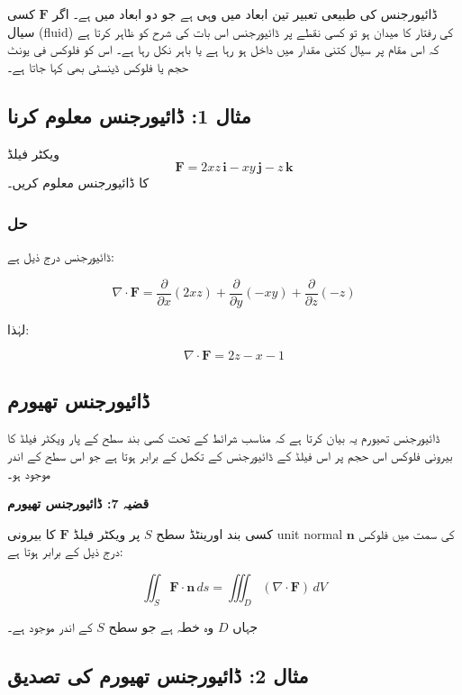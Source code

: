 \begin{enumerate}
ڈائیورجنس کی طبیعی تعبیر تین ابعاد میں وہی ہے جو دو ابعاد میں ہے۔ اگر \( \mathbf{F} \) کسی سیال (fluid) کی رفتار کا میدان ہو تو کسی نقطے پر ڈائیورجنس اس بات کی شرح کو ظاہر کرتا ہے کہ اس مقام پر سیال کتنی مقدار میں داخل ہو رہا ہے یا باہر نکل رہا ہے۔ اس کو فلوکس فی یونٹ حجم یا فلوکس ڈینسٹی بھی کہا جاتا ہے۔

\bigskip

\subsection*{مثال 1: ڈائیورجنس معلوم کرنا}

ویکٹر فیلڈ
\[
\mathbf{F} = 2xz\,\mathbf{i} - xy\,\mathbf{j} - z\,\mathbf{k}
\]
کا ڈائیورجنس معلوم کریں۔

\subsubsection*{حل}

ڈائیورجنس درج ذیل ہے:

\[
\nabla \cdot \mathbf{F}
=
\frac{\partial}{\partial x}(2xz)
+
\frac{\partial}{\partial y}(-xy)
+
\frac{\partial}{\partial z}(-z)
\]

لہٰذا:

\[
\nabla \cdot \mathbf{F}
=
2z - x - 1
\]


\subsection*{ڈائیورجنس تھیورم}

ڈائیورجنس تھیورم یہ بیان کرتا ہے کہ مناسب شرائط کے تحت کسی بند سطح کے پار ویکٹر فیلڈ کا بیرونی فلوکس اس حجم پر اس فیلڈ کے ڈائیورجنس کے تکمل کے برابر ہوتا ہے جو اس سطح کے اندر موجود ہو۔

\bigskip

\textbf{قضیہ 7: ڈائیورجنس تھیورم}

کسی بند اورینٹڈ سطح \( S \) پر ویکٹر فیلڈ \( \mathbf{F} \) کا بیرونی unit normal \( \mathbf{n} \) کی سمت میں فلوکس درج ذیل کے برابر ہوتا ہے:

\[
\iint_S \mathbf{F} \cdot \mathbf{n}\, ds
=
\iiint_D (\nabla \cdot \mathbf{F})\, dV
\tag{2}
\]

جہاں \( D \) وہ خطہ ہے جو سطح \( S \) کے اندر موجود ہے۔

\bigskip

\subsection*{مثال 2: ڈائیورجنس تھیورم کی تصدیق}


\end{enumerate}
